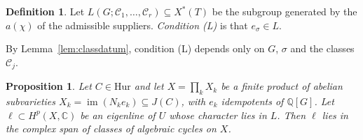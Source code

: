 \documentclass[11pt]{amsart}
\newtheorem{proposition}[theorem]{Proposition}
\theoremstyle{definition}
\newtheorem{definition}[theorem]{Definition}
\theoremstyle{remark}
\newcommand{\Q}{\mathbb Q}
\newcommand{\C}{\mathbb C}
\newcommand{\cH}{\mathrm{Hur}}
\begin{document}
\begin{definition}\label{def:lattice}
Let $L(G;\mathcal C_1,\dots,\mathcal C_r)\subseteq X^*(T)$ be the subgroup generated by the $a(\chi)$ of the admissible suppliers. \emph{Condition (L)} is that $e_\sigma\in L$.
\end{definition}

By Lemma~\ref{lem:classdatum}, condition (L) depends only on $G$, $\sigma$ and the classes $\mathcal C_j$.

\begin{proposition}\label{prop:supply}
Let $C\in\cH$ and let $X=\prod_kX_k$ be a finite product of abelian subvarieties $X_k=\operatorname{im}(N_ke_k)\subseteq J(C)$, with $e_k$ idempotents of $\Q[G]$. Let $\ell\subset H^p(X,\C)$ be an eigenline of $U$ whose character lies in $L$. Then $\ell$ lies in the complex span of classes of algebraic cycles on $X$.
\end{proposition}
\end{document}
